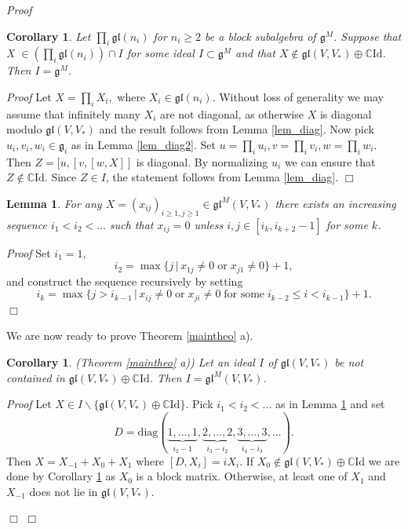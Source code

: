 \documentclass{svmult}
\newtheorem{lem}[theo]{Lemma}
\newtheorem{cor}[theo]{Corollary}
\renewenvironment{proof}{ \emph{Proof}}{$\Box$}
\newcommand {\CC} {\mathbb {C}}
\newcommand{\oj}{\mathfrak{g}}
\newcommand{\ojl}{\mathfrak{gl}}
\newcommand{\id}{\mathrm{Id}}
\renewcommand{\gg}{\mathfrak{g}}
\newcommand{\gl}{\mathfrak{gl}}
\begin{document}
\begin{proof}
\begin{cor}\label{cor_1} Let $\prod_{i} \gl(n_i)$ for $n_i \geq 2$ be a block subalgebra of $\gg^M$. 
Suppose that X $\in \left(\prod_{i} \gl(n_i)\right) \cap I$ for some ideal $I \subset \gg^M$ and that $X \notin \gl(V,V_*) \oplus \CC \mathrm{Id}$. Then $I = \gg^M$.
\end{cor}
\begin{proof}
 Let $X = \prod_i X_i,$ where $X_i \in \gl(n_i)$. Without loss of generality we may assume that infinitely many $X_i$ are not diagonal, as otherwise $X$ is diagonal modulo $\gl(V,V_*)$ and the result follows from Lemma \ref{lem_diag}. Now pick $u_i,v_i,w_i \in \oj_i$ as in Lemma \ref{lem_diag2}. Set $u = \prod_i u_i, v=\prod_i v_i, w=\prod_i w_i$. Then $Z=[u,[v,[w,X]]$ is diagonal. By normalizing $u_i$ we can ensure that $Z \notin \CC \id$. Since $Z \in I$, the statement follows from Lemma \ref{lem_diag}.
\end{proof}

\begin{lem}\label{lem_4} 
For any $X = (x_{ij})_{i\geq1,j\geq1}\in \gl^M(V,V_*)$ there exists an increasing sequence $i_1<i_2<\dots$ such that 
$x_{ij}=0$ unless $i,j \in \left[i_k,i_{k+2}-1\right]$ for some $k$. 
\end{lem}


\begin{proof} Set $i_1 =1$,
 \begin{equation}
  i_2 = \max\lbrace j\,|\, x_{1j}\neq0\; \mbox{or}\; x_{j1}\neq0\rbrace+1, \nonumber 
 \end{equation}
and construct the sequence recursively by setting 
\begin{equation}
 i_k = \max \lbrace j > i_{k-1}\,|\, x_{ij} \neq0\; \mbox{or}\; x_{ji} \neq0 \;\mbox{for some}\; i_{k-2} \leq i < i_{k-1}\rbrace +1.\nonumber
\end{equation}
\end{proof}

We are now ready to prove Theorem \ref{maintheo} a).

\begin{cor}\label{cor_2}(Theorem \ref{maintheo} a))  
Let an ideal $I$ of $ \gl(V,V_*)$ be not contained in $\gl (V,V_*) \oplus \CC \id$. Then $I=\gl^M(V,V_*)$.
\end{cor}

\begin{proof}
 Let $X \in I \backslash \lbrace\ojl(V,V_*) \oplus \CC \mathrm{Id}\rbrace$. Pick $i_1 < i_2 < \dots$ as in Lemma \ref{lem_4} and set 
\begin{equation}
 D = \mathrm{diag} (\underbrace{1, \dots, 1}_{i_2-1}, \underbrace{2, \dots ,2}_{i_3-i_2}, \underbrace{3, \dots, 3}_{i_4-i_3}, \dots). \nonumber
\end{equation}
 Then $X=X_{-1}+X_0+X_1$ where $[D,X_i]=iX_i$. If $X_0 \notin \ojl(V,V_*) \oplus \CC \id$ we are done by Corollary \ref{cor_1} as $X_0$ is a block matrix. Otherwise, at least one of $X_1$ and $X_{-1}$ does not lie in $\ojl(V,V_*)$.


\end{proof}
\end{proof}
\end{document}
